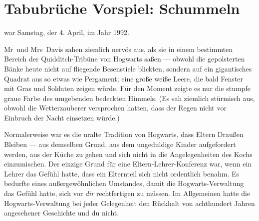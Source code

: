 \chapter{Tabubrüche Vorspiel: Schummeln}

 war Samstag, der 4. April, im Jahr 1992.

\hplettrineextrapara
Mr~und Mrs~Davis sahen ziemlich nervös aus, als sie in einem bestimmten Bereich der Quidditch-Tribüne von Hogwarts saßen — obwohl die gepolsterten Bänke heute nicht auf fliegende Besenstiele blickten, sondern auf ein gigantisches Quadrat aus so etwas wie Pergament; eine große weiße Leere, die bald Fenster mit Gras und Soldaten zeigen würde. Für den Moment zeigte es nur die stumpfe graue Farbe des umgebenden bedeckten Himmels. (Es sah ziemlich stürmisch aus, obwohl die Wetterzauberer versprochen hatten, dass der Regen nicht vor Einbruch der Nacht einsetzen würde.)

Normalerweise war es die uralte Tradition von Hogwarts, dass Eltern Draußen Bleiben — aus demselben Grund, aus dem ungeduldige Kinder aufgefordert werden, aus der Küche zu gehen und sich nicht in die Angelegenheiten des Kochs einzumischen. Der einzige Grund für eine Eltern-Lehrer-Konferenz war, wenn ein Lehrer das Gefühl hatte, dass ein Elternteil sich nicht ordentlich benahm. Es bedurfte eines außergewöhnlichen Umstandes, damit die Hogwarts-Verwaltung das Gefühl hatte, sich vor \emph{dir} rechtfertigen zu müssen. Im Allgemeinen hatte die Hogwarts-Verwaltung bei jeder Gelegenheit den Rückhalt von achthundert Jahren angesehener Geschichte und du nicht.

